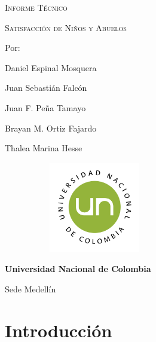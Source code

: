 \documentclass[
]{article}
\author{}
\date{\vspace{-2.5em}}
\begin{document}
\begin{titlepage}
\centering
{\scshape\Huge Informe Técnico \par}
{\scshape\Huge  Satisfacción de Niños y Abuelos \par}
\vspace{2cm}
{\Large Por: \par}
{\Large Daniel Espinal Mosquera\par}
{\Large Juan Sebastián Falcón\par}
{\Large Juan F. Peña Tamayo\par}
{\Large Brayan M. Ortiz Fajardo\par}
{\Large Thalea Marina Hesse\par}
\vfill
\vspace{0.5cm}


\begin{center}\includegraphics[width=300px,height=150px]{Imagenes/LOGO} \end{center}
\vfill
\vspace{0.5cm}
{\bfseries\LARGE Universidad Nacional de Colombia \par Sede Medellín \par}
\vspace{1cm}
\end{titlepage}

\hypertarget{introducciuxf3n}{%
\section{Introducción}\label{introducciuxf3n}}
\end{document}
